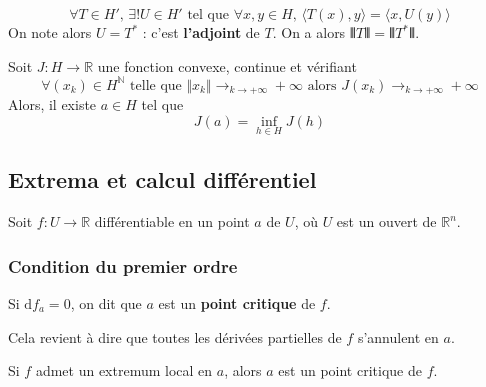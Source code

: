   \begin{corollary}
    \[ \forall T \in H', \, \exists! U \in H' \text{ tel que } \forall x, y \in H, \, \langle T(x), y \rangle = \langle x, U(y) \rangle \]
    On note alors $U = T^*$ : c'est \textbf{l'adjoint} de $T$. On a alors $\VERT T \VERT = \VERT T^* \VERT$.
  \end{corollary}


  \begin{application}
    Soit $J : H \rightarrow \mathbb{R}$ une fonction convexe, continue et vérifiant
    \[ \forall (x_k) \in H^{\mathbb{N}} \text{ telle que } \Vert x_k \Vert \longrightarrow_{k \rightarrow +\infty} +\infty \text{ alors } J(x_k) \longrightarrow_{k \rightarrow +\infty} +\infty \]
    Alors, il existe $a \in H$ tel que
    \[ J(a) = \inf_{h \in H} J(h) \]
  \end{application}

  \subsection{Extrema et calcul différentiel}

  Soit $f : U \rightarrow \mathbb{R}$ différentiable en un point $a$ de $U$, où $U$ est un ouvert de $\mathbb{R}^n$.

  \subsubsection{Condition du premier ordre}


  \begin{definition}
    Si $\mathrm{d}f_a = 0$, on dit que $a$ est un \textbf{point critique} de $f$.
  \end{definition}

  \begin{remark}
    Cela revient à dire que toutes les dérivées partielles de $f$ s'annulent en $a$.
  \end{remark}

  \begin{proposition}
    Si $f$ admet un extremum local en $a$, alors $a$ est un point critique de $f$.
  \end{proposition}


